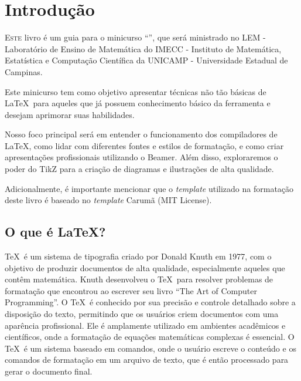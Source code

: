 \chapter{Introdução}


\lettrine{E}{ste} livro é um guia para o minicurso ``\booktitle'', que será ministrado no LEM - Laboratório de Ensino de Matemática do IMECC - Instituto de Matemática, Estatística e Computação Científica da UNICAMP - Universidade Estadual de Campinas.

Este minicurso tem como objetivo apresentar técnicas não tão básicas de \LaTeX\ para aqueles que já possuem conhecimento básico da ferramenta e desejam aprimorar suas habilidades.

Nosso foco principal será em entender o funcionamento dos compiladores de \LaTeX, como lidar com diferentes fontes e estilos de formatação, e como criar apresentações profissionais utilizando o Beamer. Além disso, exploraremos o poder do TikZ para a criação de diagramas e ilustrações de alta qualidade.

Adicionalmente, é importante mencionar que o \textit{template} utilizado na formatação deste livro é baseado no \textit{template} Carumã \cite{gomes2021carauma} (MIT License).


\section{O que é \LaTeX?}


\TeX\ é um sistema de tipografia criado por Donald Knuth em 1977, com o objetivo de produzir documentos de alta qualidade, especialmente aqueles que contêm matemática. Knuth desenvolveu o \TeX\ para resolver problemas de formatação que encontrou ao escrever seu livro ``The Art of Computer Programming''. O \TeX\ é conhecido por sua precisão e controle detalhado sobre a disposição do texto, permitindo que os usuários criem documentos com uma aparência profissional. Ele é amplamente utilizado em ambientes acadêmicos e científicos, onde a formatação de equações matemáticas complexas é essencial. O \TeX\ é um sistema baseado em comandos, onde o usuário escreve o conteúdo e os comandos de formatação em um arquivo de texto, que é então processado para gerar o documento final.

